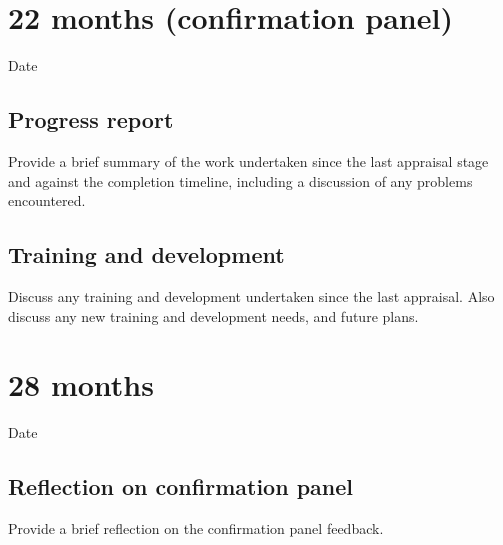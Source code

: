 \documentclass[12pt,a4paper]{article}
\begin{document}
\section{22 months (confirmation panel)}

\begin{description}
	\item[Date] %
\end{description}

\subsection{Progress report}
Provide a brief summary of the work undertaken since the last appraisal stage and against the completion timeline, including a discussion of any problems encountered. %

\subsection{Training and development}
Discuss any training and development undertaken since the last appraisal. Also discuss any new training and development needs, and future plans. %


\section{28 months}

\begin{description}
	\item[Date] %
\end{description}

\subsection{Reflection on confirmation panel}
Provide a brief reflection on the confirmation panel feedback. %
\end{document}
